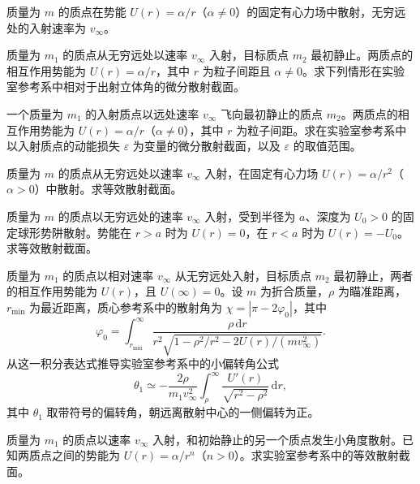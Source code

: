 \newpage
\noindent\begin{minipage}{\textwidth}
质量为 $m$ 的质点在势能 $U(r)=\alpha/r$（$\alpha\ne0$）的固定有心力场中散射，无穷远处的入射速率为 $v_\infty$。
\end{minipage}\par\vfill
\noindent\begin{minipage}{\textwidth}
质量为 $m_1$ 的质点从无穷远处以速率 $v_\infty$ 入射，目标质点 $m_2$ 最初静止。两质点的相互作用势能为 $U(r)=\alpha/r$，其中 $r$ 为粒子间距且 $\alpha\ne0$。求下列情形在实验室参考系中相对于出射立体角的微分散射截面。
\end{minipage}\par\vfill
\newpage
\noindent\begin{minipage}{\textwidth}
一个质量为 $m_1$ 的入射质点以远处速率 $v_\infty$ 飞向最初静止的质点 $m_2$。两质点的相互作用势能为 $U(r)=\alpha/r$（$\alpha\ne0$），其中 $r$ 为粒子间距。求在实验室参考系中以入射质点的动能损失 $\varepsilon$ 为变量的微分散射截面，以及 $\varepsilon$ 的取值范围。
\end{minipage}\par\vfill
\noindent\begin{minipage}{\textwidth}
质量为 $m$ 的质点从无穷远处以速率 $v_\infty$ 入射，在固定有心力场 $U(r)=\alpha/r^2$（$\alpha>0$）中散射。求等效散射截面。
\end{minipage}\par\vfill
\newpage
\noindent\begin{minipage}{\textwidth}
质量为 $m$ 的质点以无穷远处的速率 $v_\infty$ 入射，受到半径为 $a$、深度为 $U_0>0$ 的固定球形势阱散射。势能在 $r>a$ 时为 $U(r)=0$，在 $r<a$ 时为 $U(r)=-U_0$。求等效散射截面。
\end{minipage}\par\vfill
\noindent\begin{minipage}{\textwidth}
质量为 $m_1$ 的质点以相对速率 $v_\infty$ 从无穷远处入射，目标质点 $m_2$ 最初静止，两者的相互作用势能为 $U(r)$，且 $U(\infty)=0$。设 $m$ 为折合质量，$\rho$ 为瞄准距离，$r_{\min}$ 为最近距离，质心参考系中的散射角为 $\chi=|\pi-2\varphi_0|$，其中
\[
\varphi_0=\int_{r_{\min}}^\infty
\frac{\rho\,\mathrm dr}{r^2\sqrt{1-\rho^2/r^2-2U(r)/(m v_\infty^2)}}.
\]
从这一积分表达式推导实验室参考系中的小偏转角公式
\[
\theta_1\simeq-\frac{2\rho}{m_1v_\infty^2}
\int_\rho^\infty\frac{U'(r)}{\sqrt{r^2-\rho^2}}\,\mathrm dr,
\]
其中 $\theta_1$ 取带符号的偏转角，朝远离散射中心的一侧偏转为正。
\end{minipage}\par\vfill
\newpage
\noindent\begin{minipage}{\textwidth}
质量为 $m_1$ 的质点以速率 $v_\infty$ 入射，和初始静止的另一个质点发生小角度散射。已知两质点之间的势能为 $U(r)=\alpha/r^n$（$n>0$）。求实验室参考系中的等效散射截面。
\end{minipage}\par\vfill
